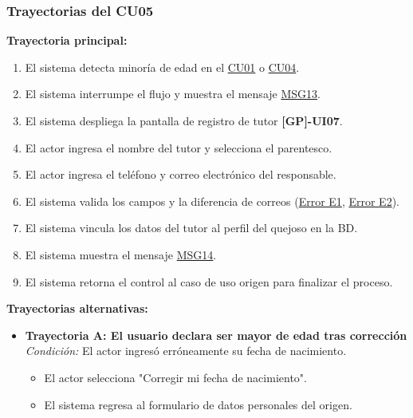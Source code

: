 \begin{appendices}
\subsubsection{Trayectorias del CU05}
\textbf{Trayectoria principal:}
\begin{enumerate}[nosep]
    \item El sistema detecta minoría de edad en el \hyperlink{anexo:casos_uso}{CU01} o \hyperlink{anexo:casos_uso}{CU04}.
    \item El sistema interrumpe el flujo y muestra el mensaje \hyperlink{msg:MSG13}{MSG13}.
    \item El sistema despliega la pantalla de registro de tutor \textbf{[GP]-UI07}.
    \item El actor ingresa el nombre del tutor y selecciona el parentesco.
    \item El actor ingresa el teléfono y correo electrónico del responsable.
    \item El sistema valida los campos y la diferencia de correos (\hyperlink{err:E8}{Error E1}, \hyperlink{err:E9}{Error E2}).
    \item El sistema vincula los datos del tutor al perfil del quejoso en la BD.
    \item El sistema muestra el mensaje \hyperlink{msg:MSG14}{MSG14}.
    \item El sistema retorna el control al caso de uso origen para finalizar el proceso.
\end{enumerate}

\textbf{Trayectorias alternativas:}
\begin{itemize}[leftmargin=*]
    \item \textbf{Trayectoria A: El usuario declara ser mayor de edad tras corrección} \\
    \textit{Condición:} El actor ingresó erróneamente su fecha de nacimiento.
    \begin{itemize}[nosep]
        \item[A-1:] El actor selecciona "Corregir mi fecha de nacimiento".
        \item[A-2:] El sistema regresa al formulario de datos personales del origen.
    \end{itemize}
\end{itemize}

\newpage


\end{appendices}
